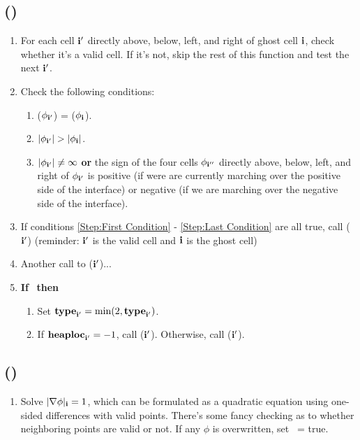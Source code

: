 \subsection{(\ib)}
\begin{enumerate}
\item For each cell ${\bf i}'$ directly above, below, left, and right of ghost cell ${\bf i}$, check whether it's a valid cell.  If it's not, skip the rest of this function and test the next ${\bf i}'$.
\item Check the following conditions:
\begin{enumerate}
\item \label{Step:First Condition} \sign($\phi_{{\bf i}'}$) = \sign($\phi_{\bf i}$).
\item $|\phi_{{\bf i}'}| > |\phi_{\bf i}|$.
\item \label{Step:Last Condition} $|\phi_{{\bf i}'}| \ne \infty$ {\bf or} the sign of the four cells $\phi_{{\bf i}''}$ directly above, below, left, and right of $\phi_{{\bf i}'}$ is positive (if were are currently marching over the positive side of the interface) or negative (if we are marching over the negative side of the interface).
\end{enumerate}
\item If conditions \ref{Step:First Condition} - \ref{Step:Last Condition} are all true, call (${\bf i}'$) (reminder: ${\bf i}'$ is the valid cell and ${\bf i}$ is the ghost cell)
\item Another call to (${\bf i}'$)...
\item {\bf If} \isnew~{\bf then}
\begin{enumerate}
\item Set ${\tt{\bf type}}_{{\bf i}'} = \min(2,{\tt{\bf type}}_{{\bf i}'})$.
\item If ${\tt{\bf heaploc}}_{{\bf i}'} = -1$, call \ADDNODE(${\bf i}'$).  Otherwise, call \UPDATENODE(${\bf i}'$).
\end{enumerate}
\end{enumerate}
\subsection{(\ib)}
\begin{enumerate}
\item Solve $|\nabla\phi|_{{\bf i}}=1$, which can be formulated as a quadratic equation using one-sided differences with valid points.  There's some fancy checking as to whether neighboring points are valid or not.  If any $\phi$ is overwritten, set \isnew~= true.
\end{enumerate}
